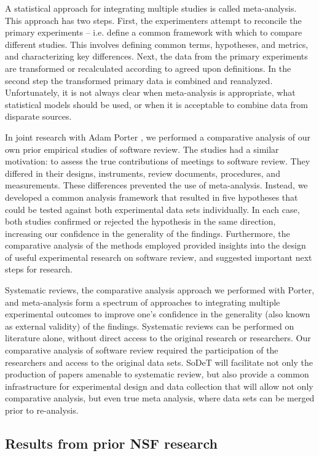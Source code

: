 A statistical approach for integrating multiple studies is called
meta-analysis. This approach has two steps. First, the experimenters
attempt to reconcile the primary experiments -- i.e. define a common
framework with which to compare different studies.  This involves defining
common terms, hypotheses, and metrics, and characterizing key differences.
Next, the data from the primary experiments are transformed or recalculated
according to agreed upon definitions. In the second step the transformed
primary data is combined and reanalyzed.  Unfortunately, it is not always
clear when meta-analysis is appropriate, what statistical models should be
used, or when it is acceptable to combine data from disparate sources.

In joint research with Adam Porter \cite{csdl-97-02}, we performed a
comparative analysis of our own prior empirical studies of software review.
The studies had a similar motivation: to assess the true contributions of
meetings to software review. They differed in their designs, instruments,
review documents, procedures, and measurements. These differences prevented
the use of meta-analysis. Instead, we developed a common analysis framework
that resulted in five hypotheses that could be tested against both
experimental data sets individually.  In each case, both studies confirmed
or rejected the hypothesis in the same direction, increasing our confidence
in the generality of the findings.  Furthermore, the comparative analysis
of the methods employed provided insights into the design of useful
experimental research on software review, and suggested important next
steps for research.

Systematic reviews, the comparative analysis approach we performed with
Porter, and meta-analysis form a spectrum of approaches to integrating
multiple experimental outcomes to improve one's confidence in the
generality (also known as external validity) of the findings.  Systematic
reviews can be performed on literature alone, without direct access to the
original research or researchers. Our comparative analysis of software
review required the participation of the researchers and access to the
original data sets. SoDeT will facilitate not only the production of papers
amenable to systematic review, but also provide a common infrastructure for
experimental design and data collection that will allow not only
comparative analysis, but even true meta analysis, where data sets can be
merged prior to re-analysis.

\subsection{Results from prior NSF research}

